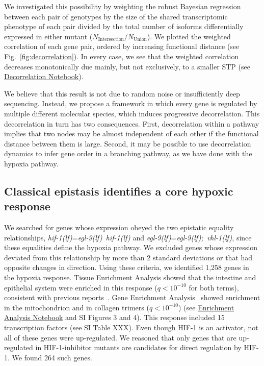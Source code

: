 \documentclass[9pt,twocolumn,twoside]{pnas-new}
\newcommand{\qval}[1]{$q<10^{-#1}$}
\newcommand{\gene}[1]{\mbox{\emph{#1}}}
\newcommand{\egl}{\gene{egl-9(lf)}}
\newcommand{\eglvhl}{\gene{egl-9(lf); vhl-1(lf)}}
\newcommand{\eglhif}{\gene{egl-9(lf) hif-1(lf)}}
\newcommand{\hif}{\gene{hif-1(lf)}}
\newcommand{\hifp}{HIF-1}
\newcommand{\hiftargets}{264}
\begin{document}
We investigated this possibility by weighting the robust Bayesian regression
between each pair of genotypes by the size of the shared transcriptomic
phenotype of each pair divided by the total number of isoforms differentially
expressed in either mutant ($N_\mathrm{Intersection}/N_{\mathrm{Union}}$). We
plotted the weighted correlation of each gene pair, ordered by increasing
functional distance (see Fig.~\ref{fig:decorrelation}). In every case, we see
that the weighted correlation decreases monotonically due mainly, but not
exclusively, to a smaller STP (see
\href{https://wormlabcaltech.github.io/mprsq/analysis_notebooks/10_decorrelation.html}
{Decorrelation Notebook}).

We believe that this result is not due to random noise or insufficiently deep
sequencing. Instead, we propose a framework in which every gene is regulated by
multiple different molecular species, which induces progressive decorrelation.
This decorrelation in turn has two consequences. First, decorrelation within a
pathway implies that two nodes may be almost independent of each other if the
functional distance between them is large. Second, it may be possible to use
decorrelation dynamics to infer gene order in a branching pathway, as we have
done with the hypoxia pathway.

\subsection{Classical epistasis identifies a core hypoxic response}
We searched for genes whose expression obeyed the two epistatic equality
relationships, \hif{}=\eglhif{} and \egl{}=\eglvhl{}, since these equalities
define the hypoxia pathway. We excluded genes whose expression deviated from
this relationship by more than 2 standard deviations or that had opposite
changes in direction. Using these criteria, we identified 1,258 genes in the
hypoxia response. Tissue Enrichment Analysis showed that the intestine and
epithelial system were enriched in this response (\qval{10} for both terms),
consistent with previous reports~\cite{Budde2010}. Gene Enrichment
Analysis~\cite{Angeles-Albores106369} showed enrichment in the mitochondrion and
in collagen trimers (\qval{10}) (see
\href{https://wormlabcaltech.github.io/mprsq/analysis_notebooks/3_ea_of_hypoxia_data.html}
{Enrichment Analysis Notebook} and SI Figures 3 and 4). This response included
15 transcription factors (see SI Table XXX). Even though \hifp{} is
an activator, not all of these genes were up-regulated. We reasoned that only
genes that are up-regulated in \hifp{}-inhibitor mutants are candidates for
direct regulation by \hifp{}. We found \hiftargets{} such genes.
\end{document}
